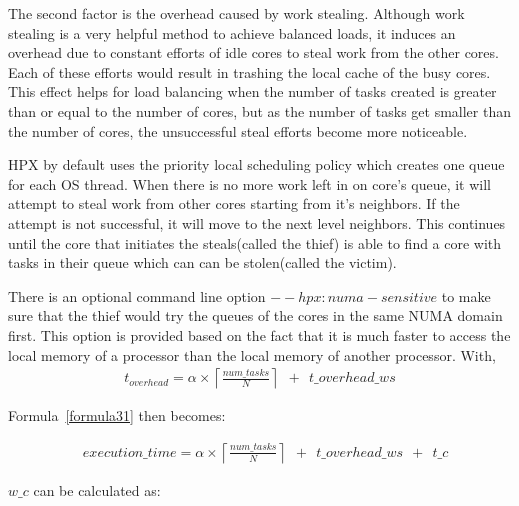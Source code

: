 The second factor is the overhead caused by work stealing. Although work stealing is a very helpful method to achieve balanced loads, it induces an overhead due to constant efforts of idle cores to steal work from the other cores. Each of these efforts would result in trashing the local cache of the busy cores. This effect helps for load balancing when the number of tasks created is greater than or equal to the number of cores, but as the number of tasks get smaller than the number of cores, the unsuccessful steal efforts become more noticeable.

HPX by default uses the priority local scheduling policy which creates one queue for each OS thread. When there is no more work left in on core's queue, it will attempt to steal work from other cores starting from it's neighbors. If the attempt is not successful, it will move to the next level neighbors. This continues until the core that initiates the steals(called the thief) is able to find a core with tasks in their queue which can can be stolen(called the victim). 

There is an optional command line option ${--hpx:numa-sensitive}$ to make sure that the thief would try the queues of the cores in the same NUMA domain first. This option is provided based on the fact that it is much faster to access the local memory of a processor than the local memory of another processor.  
With,
\begin{equation}\label{formula33}  
\begin{aligned}
t_{overhead}=\alpha\times{\left\lceil{\frac{num\_{tasks}}{N}}\right\rceil}\:\:+\:\:t\_{overhead\_{ws}}
\end{aligned}
\end{equation}

Formula~\ref{formula31} then becomes:

\begin{equation}\label{formula32}
\begin{aligned}
&execution\_time = 
\alpha\times{\left\lceil{\frac{num\_{tasks}}{N}}\right\rceil\:\:+\:\:t\_{overhead\_{ws}}\:\:+\:\:t\_c}
\end{aligned}
\end{equation}

$w\_c$ can be calculated as:
 
